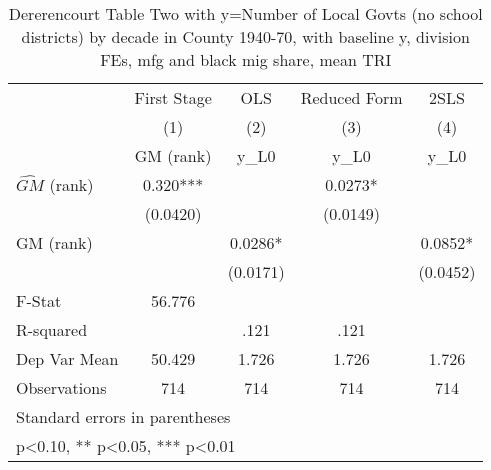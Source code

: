 \begin{table}[htbp]\centering
\def\sym#1{\ifmmode^{#1}\else\(^{#1}\)\fi}
\caption{Dererencourt Table Two with y=Number of Local Govts (no school districts) by decade in County 1940-70, with baseline y, division FEs, mfg and black mig share, mean TRI}
\begin{tabular}{l*{4}{c}}
\toprule
                    & First Stage   &         OLS   &Reduced Form   &        2SLS   \\
                    &\multicolumn{1}{c}{(1)}&\multicolumn{1}{c}{(2)}&\multicolumn{1}{c}{(3)}&\multicolumn{1}{c}{(4)}\\
                    &\multicolumn{1}{c}{GM  (rank)}&\multicolumn{1}{c}{y\_L0}&\multicolumn{1}{c}{y\_L0}&\multicolumn{1}{c}{y\_L0}\\
\midrule
$\hat{GM}$ (rank)   &       0.320***&               &      0.0273*  &               \\
                    &    (0.0420)   &               &    (0.0149)   &               \\
\addlinespace
GM  (rank)          &               &      0.0286*  &               &      0.0852*  \\
                    &               &    (0.0171)   &               &    (0.0452)   \\
\midrule
F-Stat              &      56.776   &               &               &               \\
R-squared           &               &        .121   &        .121   &               \\
Dep Var Mean        &      50.429   &       1.726   &       1.726   &       1.726   \\
Observations        &         714   &         714   &         714   &         714   \\
\bottomrule
\multicolumn{5}{l}{\footnotesize Standard errors in parentheses}\\
\multicolumn{5}{l}{\footnotesize * p<0.10, ** p<0.05, *** p<0.01}\\
\end{tabular}
\end{table}
